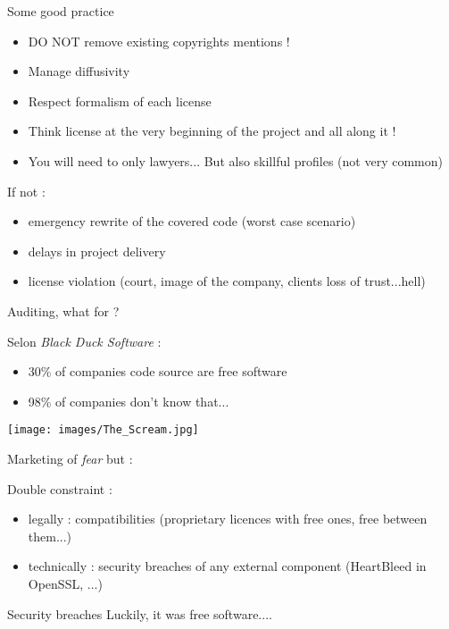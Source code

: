 \documentclass{beamer}
\begin{document}
\begin{frame}{Some good practice}
  \begin{itemize}
  \item DO NOT remove existing copyrights mentions !
  \item Manage diffusivity
  \item Respect formalism of each license
  \item Think license at the very beginning of the project and all along it !
  \item You will need to only lawyers... But also skillful profiles (not very common)
  \end{itemize}

If not :

\begin{itemize}
\item emergency rewrite of the covered code (worst case scenario)
\item delays in project delivery
\item license violation (court, image of the company, clients loss of trust...hell)
\end{itemize}
  
\end{frame}


\begin{frame}{Auditing, what for ?}

Selon \textit{Black Duck Software} :
\begin{itemize}
\item 30\% of companies code source are free software
\item 98\% of companies don't know that...

\end{itemize}

\begin{minipage}[c]{0.4\linewidth}
\texttt{[image: images/The\_Scream.jpg]}\end{minipage}
\begin{minipage}[c]{0.55\linewidth}
Marketing of \textit{fear} but :

Double constraint :
\begin{itemize}
\item legally : compatibilities (proprietary licences with free ones, free between them...)
\item technically : security breaches of any external component (HeartBleed in OpenSSL, ...)
\end{itemize}
\end{minipage}

\begin{alertblock}{Security breaches}
Luckily, it was free software....
 \end{alertblock}
 
\end{frame}
\end{document}
